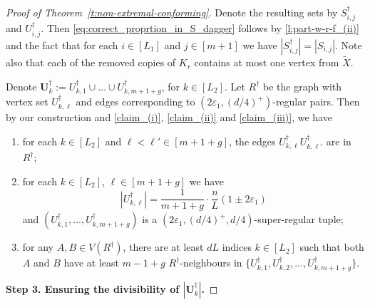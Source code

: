 \documentclass[reqno, 12pt]{amsart}
\numberwithin{equation}{section}
\numberwithin{figure}{section}
\theoremstyle{plain}
\theoremstyle{definition}
\let\eps=\varepsilon
\def\Ub{\mathbf{U}}
\begin{document}
\begin{proof}[Proof of Theorem~\ref{t:non-extremal-conforming}]
    Denote the resulting sets by $S_{i,j}^\dagger$ and $U_{i,j}^\dagger$. Then \eqref{eq:correct_proprtion_in_S_dagger} follows by \ref{l:part-w-r-f_(ii)} and the fact that for each $i\in[L_1]$ and $j\in[m+1]$ we have $|S_{i,j}^\dagger|=|S_{i,j}|$. Note also that each of the removed copies of $K_r$ contains at most one vertex from $\tilde X$.
    
    Denote $\Ub_k^\dagger := U_{k,1}^\dagger \cup \dots \cup U_{k,m+1+g}^\dagger$, for $k\in[L_2]$. Let $R^\dagger$ be the graph with vertex set $U_{k,\ell}^\dagger$ and edges corresponding to $(2\eps_1,(d/4)^+)$-regular pairs. Then by our construction and \ref{claim_(i)}, \ref{claim_(ii)} and \ref{claim_(iii)}, we have
    \begin{enumerate}[label=(\roman*$^\dagger$)]
        \item\label{(i)dagger} for each $k\in [L_2]$ and $\ell < \ell' \in [m+1+g]$, the edges $U^\dagger_{k,\ell}U^\dagger_{k,\ell'}$ are in $R^\dagger$;
        \item\label{(ii)dagger} for each $k \in [L_2]$, $\ell\in[m+1+g]$ we have 
            $$|U^\dagger_{k,\ell}|=\frac {1}{m+1+g}\cdot\frac{n}{L}(1 \pm 2\eps_1)$$
            and $(U^\dagger_{k,1},\dots, U^\dagger_{k,m+1+g})$ is a $\left(2\eps_1,\left(d/4\right)^+,d/4\right)$-super-regular tuple;
        \item\label{(iii)dagger} for any $A,B\in V(R^\dagger)$, there are at least $dL$ indices $k\in[L_2]$ such that both $A$ and $B$ have at least $m-1+g$ $R^\dagger$-neighbours in $\{U_{k,1}^\dagger, U_{k,2}^\dagger,\dots, U_{k,m+1+g}^\dagger\}$.
    \end{enumerate}
    

    \smallskip

    \textbf{Step 3. Ensuring the divisibility of $|\Ub_k^\dagger|$.} 

    \smallskip


\end{proof}
\end{document}
